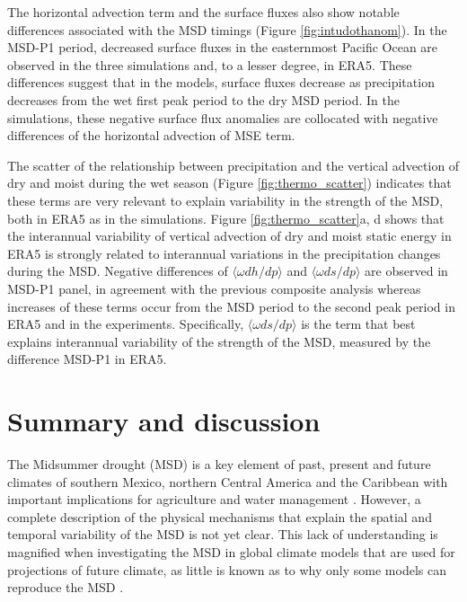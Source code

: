 The horizontal advection term and the surface fluxes also show notable differences associated with the MSD timings (Figure \ref{fig:intudothanom}). In the MSD-P1 period, decreased surface fluxes in the easternmost Pacific Ocean are observed in the three simulations and, to a lesser degree, in ERA5. These differences suggest that in the models, surface fluxes decrease as precipitation decreases from the wet first peak period to the dry MSD period. In the simulations, these negative surface flux anomalies are collocated with negative differences of the horizontal advection of MSE term. 


The scatter of the relationship between precipitation and the vertical advection of dry and moist during the wet season (Figure \ref{fig:thermo_scatter}) indicates that these terms are very relevant to explain variability in the strength of the MSD, both in ERA5 as in the simulations. Figure \ref{fig:thermo_scatter}a, d shows that the interannual variability of vertical advection of dry and moist static energy in ERA5 is strongly related to interannual variations in the precipitation changes during the MSD. Negative differences of $\langle \omega dh/dp \rangle$ and $\langle \omega ds/dp \rangle$ are observed in MSD-P1 panel, in agreement with the previous composite analysis whereas increases of these terms occur from the MSD period to the second peak period in ERA5 and in the experiments. Specifically, $\langle \omega ds/dp \rangle$ is the term that best explains interannual variability of the strength of the MSD, measured by the difference MSD-P1 in ERA5. 



\section{Summary and discussion}\label{sq:sumdiscuss}

The Midsummer drought (MSD) is a key element of past, present and future climates of southern Mexico, northern Central America and the Caribbean with important implications for agriculture and water management \citep{hellin2017,de2018,harvey2018}. However, a complete description of the physical mechanisms that explain the spatial and temporal variability of the MSD is not yet clear. This lack of understanding is magnified when investigating the MSD in global climate models that are used for projections of future climate, as little is known as to why only some models can reproduce the MSD \citep{ryu2014}.


